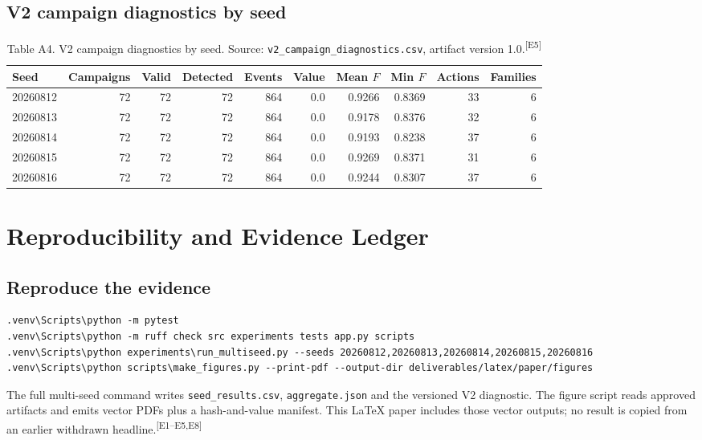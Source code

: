 \documentclass[11pt,a4paper,oneside]{article}
\newcommand{\evidence}[1]{\textsuperscript{\textcolor{EvidenceGray}{[#1]}}}
\begin{document}
\subsection{V2 campaign diagnostics by seed}
\begin{table}[H]
\centering\scriptsize
\begin{tabular}{lrrrrrrrrr}
\toprule
\textbf{Seed} & \textbf{Campaigns} & \textbf{Valid} & \textbf{Detected} & \textbf{Events} & \textbf{Value} & \textbf{Mean $F$} & \textbf{Min $F$} & \textbf{Actions} & \textbf{Families} \\
\midrule
20260812 & 72 & 72 & 72 & 864 & 0.0 & 0.9266 & 0.8369 & 33 & 6 \\
20260813 & 72 & 72 & 72 & 864 & 0.0 & 0.9178 & 0.8376 & 32 & 6 \\
20260814 & 72 & 72 & 72 & 864 & 0.0 & 0.9193 & 0.8238 & 37 & 6 \\
20260815 & 72 & 72 & 72 & 864 & 0.0 & 0.9269 & 0.8371 & 31 & 6 \\
20260816 & 72 & 72 & 72 & 864 & 0.0 & 0.9244 & 0.8307 & 37 & 6 \\
\bottomrule
\end{tabular}
\caption*{Table A4. V2 campaign diagnostics by seed. Source: \texttt{v2\_campaign\_diagnostics.csv}, artifact version 1.0.\evidence{E5}}
\end{table}

\section{Reproducibility and Evidence Ledger}
\subsection{Reproduce the evidence}
\begin{lstlisting}[style=aegiscode]
.venv\Scripts\python -m pytest
.venv\Scripts\python -m ruff check src experiments tests app.py scripts
.venv\Scripts\python experiments\run_multiseed.py --seeds 20260812,20260813,20260814,20260815,20260816
.venv\Scripts\python scripts\make_figures.py --print-pdf --output-dir deliverables/latex/paper/figures
\end{lstlisting}
The full multi-seed command writes \texttt{seed\_results.csv}, \texttt{aggregate.json} and the versioned V2 diagnostic. The figure script reads approved artifacts and emits vector PDFs plus a hash-and-value manifest. This LaTeX paper includes those vector outputs; no result is copied from an earlier withdrawn headline.\evidence{E1--E5,E8}
\end{document}
